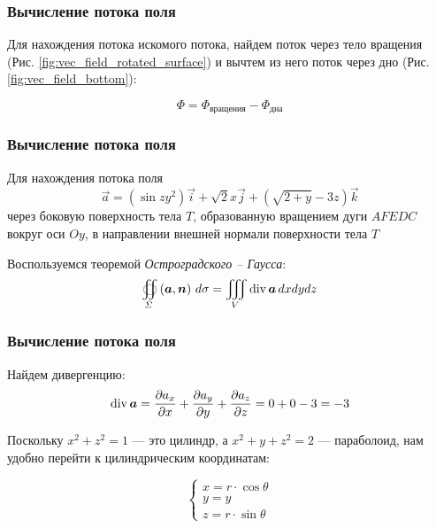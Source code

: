 \begin{frame}\frametitle{Вычисление потока поля}
  Для нахождения потока искомого потока, найдем поток через тело вращения (Рис. \ref{fig:vec_field_rotated_surface}) и вычтем из него поток через дно (Рис. \ref{fig:vec_field_bottom}):

	\begin{equation*}
		\Phi = \Phi_{\text{вращения}} - \Phi_{\text{дна}}
	\end{equation*}


\end{frame}

\begin{frame}\frametitle{Вычисление потока поля}
	Для нахождения потока поля
	\begin{equation*}
		\vec a = (\sin zy^2) \vec i + \sqrt{2} x \vec j + (\sqrt{2+y} -3z) \vec k
	\end{equation*}
	через боковую поверхность тела \(T\), образованную вращением дуги \(AFEDC\)
	вокруг оси \(Oy\), в направлении внешней нормали поверхности тела \(T\)

	Воспользуемся теоремой \textit{Остроградского -- Гаусса}:
	\begin{equation*}
		\oiint\limits_{\Sigma}\left( \vec {a}, \vec {n} \right) \, d\sigma = \iiint\limits_V \Div \vec {a} \, dxdydz
	\end{equation*}
\end{frame}

\begin{frame}\frametitle{Вычисление потока поля}
	Найдем дивергенцию:
	\begin{equation*}
		\Div \vec a = \frac{\partial a_x}{\partial x} +  \frac{\partial a_y}{\partial y} +  \frac{\partial a_z}{\partial z} = 0 + 0 - 3 = -3
	\end{equation*}

	Поскольку $x^2 + z^2 = 1$ — это цилиндр, а $x^2 + y + z^2 = 2$ — параболоид, нам удобно перейти к цилиндрическим координатам:

	\begin{equation*}
		\begin{cases}
			x = r \cdot \cos \theta \\
			y = y                   \\
			z = r \cdot \sin \theta
		\end{cases}
	\end{equation*}

\end{frame}

